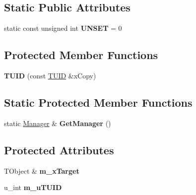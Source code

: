 \subsection*{Static Public Attributes}
\begin{DoxyCompactItemize}
\item 
\hypertarget{class_k_g_e_1_1_t_u_i_d_a21cb15152251a6ec71f1d77bb9c55b51}{static const unsigned int {\bfseries U\-N\-S\-E\-T} = 0}\label{class_k_g_e_1_1_t_u_i_d_a21cb15152251a6ec71f1d77bb9c55b51}

\end{DoxyCompactItemize}
\subsection*{Protected Member Functions}
\begin{DoxyCompactItemize}
\item 
\hypertarget{class_k_g_e_1_1_t_u_i_d_acc7f7cd5d011a6bd1c14384f77beb4a8}{{\bfseries T\-U\-I\-D} (const \hyperlink{class_k_g_e_1_1_t_u_i_d}{T\-U\-I\-D} \&x\-Copy)}\label{class_k_g_e_1_1_t_u_i_d_acc7f7cd5d011a6bd1c14384f77beb4a8}

\end{DoxyCompactItemize}
\subsection*{Static Protected Member Functions}
\begin{DoxyCompactItemize}
\item 
\hypertarget{class_k_g_e_1_1_t_u_i_d_a6b33cdc8bcb9290470c7aed787e39771}{static \hyperlink{struct_k_g_e_1_1_t_u_i_d_1_1_manager}{Manager} \& {\bfseries Get\-Manager} ()}\label{class_k_g_e_1_1_t_u_i_d_a6b33cdc8bcb9290470c7aed787e39771}

\end{DoxyCompactItemize}
\subsection*{Protected Attributes}
\begin{DoxyCompactItemize}
\item 
\hypertarget{class_k_g_e_1_1_t_u_i_d_a64cbab98483640428c5c588128edf2f9}{T\-Object \& {\bfseries m\-\_\-x\-Target}}\label{class_k_g_e_1_1_t_u_i_d_a64cbab98483640428c5c588128edf2f9}

\item 
\hypertarget{class_k_g_e_1_1_t_u_i_d_a26c37e58a36e76791d69dc65a139f194}{u\-\_\-int {\bfseries m\-\_\-u\-T\-U\-I\-D}}\label{class_k_g_e_1_1_t_u_i_d_a26c37e58a36e76791d69dc65a139f194}

\end{DoxyCompactItemize}
